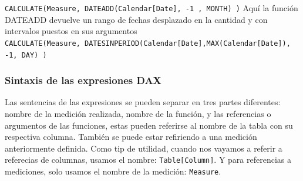 











 

\texttt{CALCULATE(Measure, DATEADD(Calendar[Date], -1 , MONTH) )} Aquí la función DATEADD devuelve un rango de fechas desplazado en la cantidad y con intervalos puestos en sus argumentos \\ 
\texttt{CALCULATE(Measure, DATESINPERIOD(Calendar[Date],MAX(Calendar[Date]), -1, DAY) )} \\









\subsubsection{Sintaxis de las expresiones DAX}

Las sentencias de las expresiones se pueden separar en tres partes diferentes: nombre de la medición realizada, nombre de la función, y las referencias o argumentos de las funciones, estas pueden referirse al nombre de la tabla con su respectiva columna. También se puede estar refiriendo a una medición anteriormente definida. Como tip de utilidad, cuando nos vayamos a referir a referecias de columnas, usamos el nombre: \texttt{Table[Column]}. Y para referencias a mediciones, solo usamos el nombre de la medición: \texttt{Measure}.


